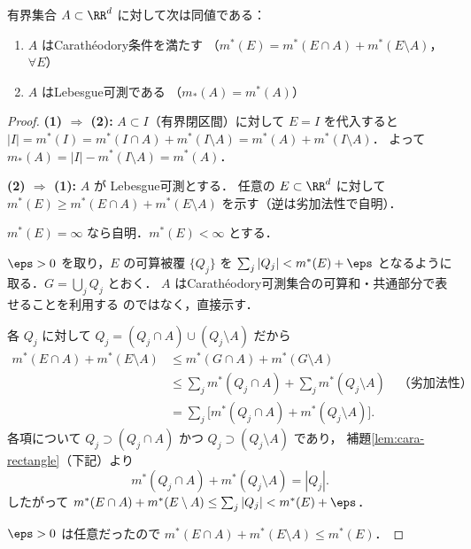 \begin{theorem}\label{thm:caratheodory-equiv-lebesgue}
有界集合 $A \subset \RR^d$ に対して次は同値である：
\begin{enumerate}
\item $A$ はCarath\'eodory条件を満たす
（$m^*(E) = m^*(E \cap A) + m^*(E \setminus A)$，$\forall E$）
\item $A$ はLebesgue可測である
（$m_*(A) = m^*(A)$）
\end{enumerate}
\end{theorem}
\begin{proof}
\textbf{(1) $\Rightarrow$ (2):}\quad
$A \subset I$（有界閉区間）に対して
$E = I$ を代入すると
$|I| = m^*(I) = m^*(I \cap A) + m^*(I \setminus A)
= m^*(A) + m^*(I \setminus A)$．
よって $m_*(A) = |I| - m^*(I \setminus A) = m^*(A)$．

\textbf{(2) $\Rightarrow$ (1):}\quad
$A$ が Lebesgue可測とする．
任意の $E \subset \RR^d$ に対して
$m^*(E) \ge m^*(E \cap A) + m^*(E \setminus A)$
を示す（逆は劣加法性で自明）．

$m^*(E) = \infty$ なら自明．$m^*(E) < \infty$ とする．

$\eps > 0$ を取り，$E$ の可算被覆 $\{Q_j\}$ を
$\sum_j |Q_j| < m^*(E) + \eps$
となるように取る．$G = \bigcup_j Q_j$ とおく．
$A$ はCarath\'eodory可測集合の可算和・共通部分で表せることを利用する
のではなく，直接示す．

各 $Q_j$ に対して
$Q_j = (Q_j \cap A) \cup (Q_j \setminus A)$ だから
\begin{align*}
m^*(E \cap A) + m^*(E \setminus A)
&\le m^*(G \cap A) + m^*(G \setminus A) \\
&\le \sum_j m^*(Q_j \cap A) + \sum_j m^*(Q_j \setminus A)
\quad \text{（劣加法性）} \\
&= \sum_j \bigl[m^*(Q_j \cap A) + m^*(Q_j \setminus A)\bigr].
\end{align*}
各項について $Q_j \supset (Q_j \cap A)$ かつ
$Q_j \supset (Q_j \setminus A)$ であり，
補題\ref{lem:cara-rectangle}（下記）より
\[
m^*(Q_j \cap A) + m^*(Q_j \setminus A) = |Q_j|.
\]
したがって
$m^*(E \cap A) + m^*(E \setminus A) \le \sum_j |Q_j| < m^*(E) + \eps$．

$\eps > 0$ は任意だったので
$m^*(E \cap A) + m^*(E \setminus A) \le m^*(E)$．
\end{proof}

